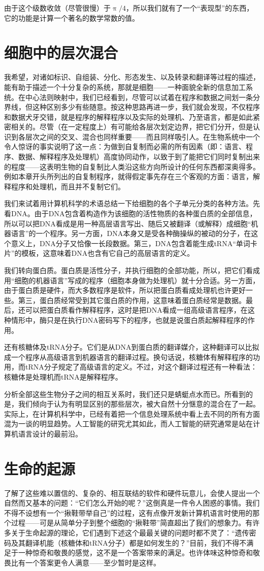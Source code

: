 由于这个级数收敛（尽管很慢）于$\uppi/4$，所以我们就有了一个“表现型”的东西，它的功能是计算一个著名的数学常数的值。

\section{细胞中的层次混合}

我希望，对诸如标识、自组装、分化、形态发生、以及转录和翻译等过程的描述，能有助于描述一个十分复杂的系统，那就是细胞——一种面貌全新的信息加工系统。在中心法则映射中，我们已经看到，尽管可以试着在程序和数据之间划一条分界线，但这种区别多少有些随意。按这种思路再进一步，我们就会发现，不仅程序和数据犬牙交错，就是程序的解释程序以及实际的处理机、乃至语言，都是如此紧密相关的。尽管（在一定程度上）有可能给各层次划定边界，把它们分开，但是认识到各层次之间的交叉、混合也同样重要——而且同样吸引人。在生物系统中一个令人惊讶的事实说明了这一点：为做到自复制而必需的所有因素（即：语言、程序、数据、解释程序及处理机）高度协同动作，以致于到了能把它们同时复制出来的程度——这表明生物的自复制比人类沿这些方向所设计的任何东西都深奥得多。例如本章开头所列出的自复制程序，就得假定事先存在三个客观的方面：语言，解释程序和处理机，而且并不复制它们。

我们来试着用计算机科学的术语总结一下给细胞的各个子单元分类的各种方法。先看DNA。由于DNA包含着构造作为该细胞的活性物质的各种蛋白质的全部信息，所以可以把DNA看成是用一种高层语言写出、随后又被翻译（或解释）成细胞“机器语言”的一个程序。另一方面，DNA本身又是受各种酶操纵的被动的分子，在这个意义上，DNA分子又恰像一长段数据。第三，DNA包含着能生成tRNA“单词卡片”的模板，这意味着DNA也含有它自己的高层语言的定义。

我们转向蛋白质。蛋白质是活性分子，并执行细胞的全部功能，所以，把它们看成用“细胞的机器语言”写成的程序（细胞本身做为处理机）就十分合适。另一方面，由于蛋白质是硬件，而大多数程序是软件，所以把蛋白质看成处理机也许更好一些。第三，蛋白质经常受到其它蛋白质的作用，这意味着蛋白质经常是数据。最后，还可以把蛋白质看作解释程序，这时是把DNA看成一组高级语言程序，在这种情形中，酶只是在执行DNA密码写下的程序，也就是说蛋白质起解释程序的作用。

还有核糖体及tRNA分子。它们是从DNA到蛋白质的翻译媒介，这种翻译可以比拟成一个程序从高级语言到机器语言的翻译过程。换句话说，核糖体有解释程序的功用，而tRNA分子规定了高级语言的定义。不过，对这个翻译过程还有一种看法：核糖体是处理机而tRNA是解释程序。

分析全部这些生物分子之间的相互关系时，我们还只是蜻蜓点水而已。所看到的是，我们倾向于认为有明显区别的那些层次，被大自然十分惬意的混合在了一起。实际上，在计算机科学中，已经有着把一个信息处理系统中看上去不同的所有方面混为一谈的明显趋势。人工智能的研究尤其如此，而人工智能的研究通常是站在计算机语言设计的最前沿。

\section{生命的起源}

了解了这些难以置信的、复杂的、相互联结的软件和硬件玩意儿，会使人提出一个自然而又基本的问题：“它们怎么开始的呢？”这倒真是一件令人困惑的事情。我们不得不设想有一个“揪鞋带举自己”的过程，这有点像开发新计算机语言时使用的那个过程——可是从简单分子到整个细胞的“揪鞋带”简直超出了我们的想象力。有许多关于生命起源的理论，它们遇到下述这个最最关键的问题时都不灵了：“遗传密码及其翻译机能（核糖体和tRNA分子）都是如何发生的？”目前，我们不得不满足于一种惊奇和敬畏的感觉，这不是一个答案带来的满足。也许体味这种惊奇和敬畏比有一个答案更令人满意——至少暂时是这样。
